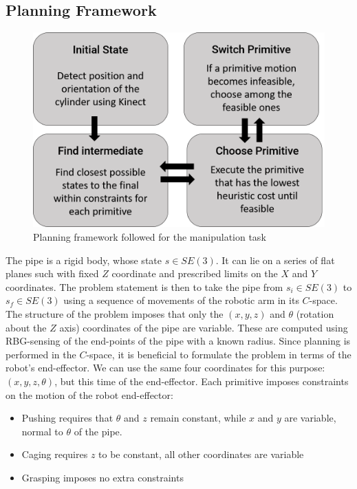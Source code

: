 \documentclass[runningheads,letterpaper]{llncs}
\begin{document}
\subsection{Planning Framework}

\begin{figure}
\centering
	\includegraphics[width=0.8\columnwidth]{images/flow.png}
\caption{Planning framework followed for the manipulation task}
\label{fig:plan}
\end{figure}


The pipe is a rigid body, whose state $s \in SE(3)$. It can lie on a series of flat planes such with fixed $Z$ coordinate and prescribed limits on the $X$ and $Y$ coordinates. The problem statement is then to take the pipe from $s_i \in SE(3)$ to $s_f \in SE(3)$ using a sequence of movements of the robotic arm in its $C$-space. The structure of the problem imposes that only the $(x,y,z)$ and $\theta$ (rotation about the $Z$ axis) coordinates of the pipe are variable. These are computed using RBG-sensing of the end-points of the pipe with a known radius. Since planning is performed in the $C$-space, it is beneficial to formulate the problem in terms of the robot's end-effector. We can use the same four coordinates for this purpose: $(x,y,z,\theta)$, but this time of the end-effector. Each primitive imposes constraints on the motion of the robot end-effector:

\begin{itemize}
\item Pushing requires that $\theta$ and $z$ remain constant, while $x$ and $y$ are variable, normal to $\theta$ of the pipe.
\item Caging requires $z$ to be constant, all other coordinates are variable
\item Grasping imposes no extra constraints
\end{itemize} 
\end{document}
